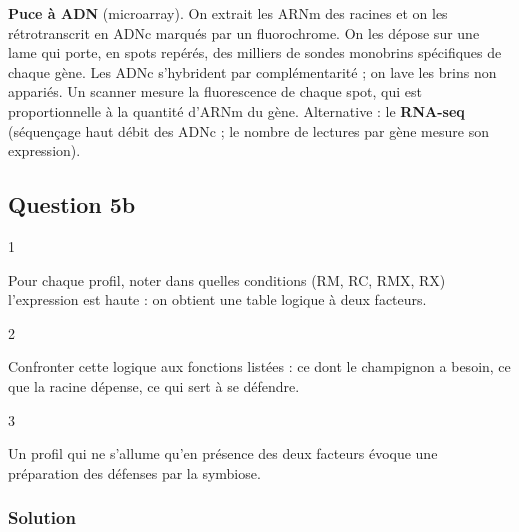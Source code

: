 \documentclass[11pt,a4paper]{article}
\begin{document}
\textbf{Puce à ADN} (microarray). On extrait les ARNm des racines et on les rétrotranscrit en ADNc marqués par un fluorochrome. On les dépose sur une lame qui porte, en spots repérés, des milliers de sondes monobrins spécifiques de chaque gène. Les ADNc s'hybrident par complémentarité ; on lave les brins non appariés. Un scanner mesure la fluorescence de chaque spot, qui est proportionnelle à la quantité d'ARNm du gène. Alternative : le \textbf{RNA-seq} (séquençage haut débit des ADNc ; le nombre de lectures par gène mesure son expression).

\hypertarget{question-5b}{%
\subsection{Question 5b}\label{question-5b}}

\begin{indication}{1}

Pour chaque profil, noter dans quelles conditions (RM, RC, RMX, RX) l'expression est haute : on obtient une table logique à deux facteurs.

\end{indication}

\begin{indication}{2}

Confronter cette logique aux fonctions listées : ce dont le champignon a besoin, ce que la racine dépense, ce qui sert à se défendre.

\end{indication}

\begin{indication}{3}

Un profil qui ne s'allume qu'en présence des deux facteurs évoque une préparation des défenses par la symbiose.

\end{indication}

\hypertarget{solution-10}{%
\subsubsection{Solution}\label{solution-10}}
\end{document}
